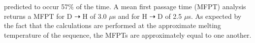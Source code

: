 \documentclass[journal=jpcbfk,manuscript=article]{achemso}
\begin{document}
predicted to occur 57\% of the time. A mean first passage time (MFPT) analysis returns a MFPT for D $\dashrightarrow$ H of 3.0 $\mu$s and for H $\dashrightarrow$ D of 2.5 $\mu$s. As expected by the fact that the calculations are performed at the approximate melting temperature of the sequence, the MFPTs are approximately equal to one another.  



\end{document}
